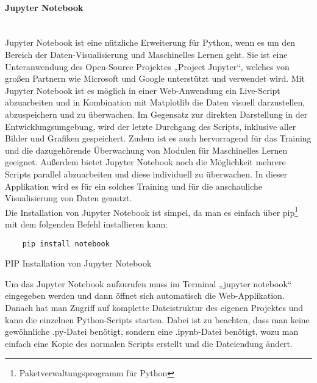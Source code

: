 \paragraph{Jupyter Notebook}\mbox{}\\
Jupyter Notebook ist eine nützliche Erweiterung für Python, wenn es um den Bereich der Daten-Visualisierung und Maschinelles Lernen geht. 
Sie ist eine Unteranwendung des Open-Source Projektes „Project Jupyter“, welches von großen Partnern wie Microsoft und Google unterstützt 
und verwendet wird. Mit Jupyter Notebook ist es möglich in einer Web-Anwendung ein Live-Script abzuarbeiten und in Kombination mit Matplotlib 
die Daten visuell darzustellen, abzuspeichern und zu überwachen. Im Gegensatz zur direkten Darstellung in der Entwicklungsumgebung, wird 
der letzte Durchgang des Scripts, inklusive aller Bilder und Grafiken gespeichert. Zudem ist es auch hervorragend für das Training und 
die dazugehörende Überwachung von Modulen für Maschinelles Lernen geeignet. Außerdem bietet Jupyter Notebook noch die Möglichkeit mehrere Scripts 
parallel abzuarbeiten und diese individuell zu überwachen. In dieser Applikation wird es für ein solches Training und für die anschauliche 
Visualisierung von Daten genutzt.\\

Die Installation von Jupyter Notebook ist simpel, da man es einfach über pip\footnote{Paketverwaltungsprogramm für Python} mit dem folgenden Befehl installieren kann:

\begin{listing}[H]
    \begin{verbatim}
    pip install notebook
    \end{verbatim}
    \caption{PIP Installation von Jupyter Notebook}
\end{listing}

Um das Jupyter Notebook aufzurufen muss im Terminal „jupyter notebook“ eingegeben werden und dann öffnet sich automatisch die Web-Applikation. 
Danach hat man Zugriff auf komplette Dateistruktur des eigenen Projektes und kann die einzelnen Python-Scripts starten. Dabei ist zu beachten, 
dass man keine gewöhnliche .py-Datei benötigt, sondern eine .ipynb-Datei benötigt, wozu man einfach eine Kopie des normalen Scripts erstellt und die Dateiendung ändert.

